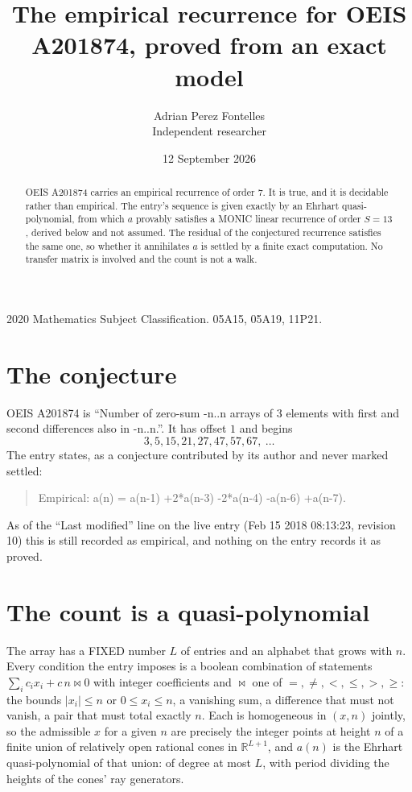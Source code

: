 \documentclass[11pt,a4paper]{article}
\title{The empirical recurrence for OEIS A201874, proved from an exact model}
\author{Adrian Perez Fontelles\\ \small Independent researcher}
\date{12 September 2026}
\theoremstyle{plain}
\theoremstyle{definition}
\begin{document}
\maketitle

\begin{abstract}
OEIS A201874 carries an empirical recurrence of order $7$. It is true, and it is
decidable rather than empirical. The entry's sequence is given exactly by an Ehrhart quasi-polynomial, from
which $a$ provably satisfies a MONIC linear recurrence of order $S=13$, derived below and not
assumed. The residual of the conjectured recurrence satisfies the same one, so whether it
annihilates $a$ is settled by a finite exact computation. No transfer matrix is involved and
the count is not a walk.
\end{abstract}

\noindent\small 2020 Mathematics Subject Classification. 05A15, 05A19, 11P21.\normalsize

\section{The conjecture}

OEIS A201874 is ``Number of zero-sum -n..n arrays of 3 elements with first and second differences also in -n..n.''. It has offset $1$ and begins
\[
3, 5, 15, 21, 27, 47, 57, 67,\ \dots
\]
The entry states, as a conjecture contributed by its author and never marked settled:
\begin{quote}
Empirical: a(n) = a(n-1) +2*a(n-3) -2*a(n-4) -a(n-6) +a(n-7).
\end{quote}
As of the ``Last modified'' line on the live entry (Feb 15 2018 08:13:23, revision 10)
this is still recorded as empirical, and nothing on the entry records it as proved.

\section{The count is a quasi-polynomial}

The array has a FIXED number $L$ of entries and an alphabet that grows with $n$. Every
condition the entry imposes is a boolean combination of statements
$\sum_i c_ix_i + c\,n \bowtie 0$ with integer coefficients and $\bowtie$ one of
$=,\ne,<,\le,>,\ge$: the bounds $|x_i|\le n$ or $0\le x_i\le n$, a vanishing sum, a difference
that must not vanish, a pair that must total exactly $n$. Each is homogeneous in $(x,n)$
jointly, so the admissible $x$ for a given $n$ are precisely the integer points at height $n$
of a finite union of relatively open rational cones in $\mathbb{R}^{L+1}$, and $a(n)$ is
the Ehrhart quasi-polynomial of that union: of degree at most $L$, with period dividing the
heights of the cones' ray generators.
\end{document}
